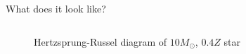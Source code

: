 \documentclass{beamer}
\begin{document}
\begin{frame}{What does it look like?}
    \begin{columns}
        \begin{column}{0.5\textwidth}
            \begin{center}
                \begin{figure}
                    \caption{Hertzsprung-Russel diagram of $10M_\odot$, $0.4Z$ star}
                \end{figure}
            \end{center}
        \end{column}
        \begin{column}{0.5\textwidth}
            \begin{center}
                \begin{figure}

\end{figure}
\end{center}
\end{column}
\end{columns}
\end{frame}
\end{document}
